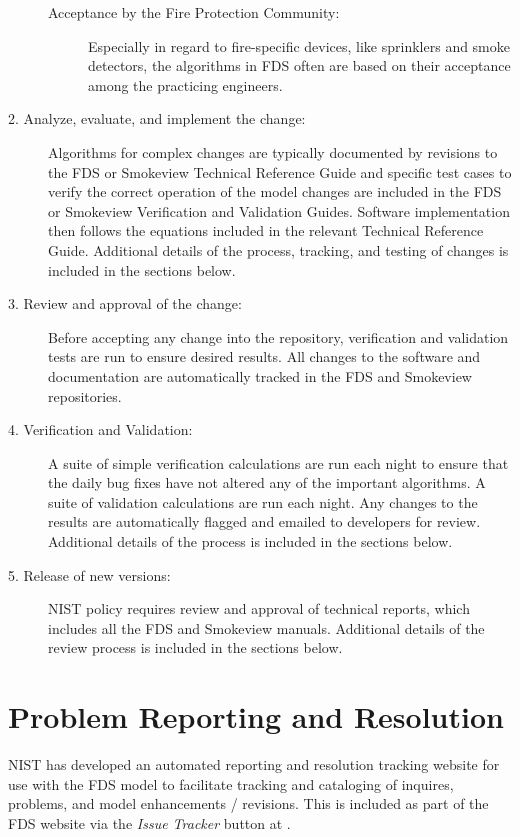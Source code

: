 \documentclass[11pt]{book}
\begin{document}
\begin{description}
\begin{description}
\item[Acceptance by the Fire Protection Community:] Especially in regard to fire-specific devices, like sprinklers and smoke detectors, the algorithms in FDS often are based on their acceptance among the practicing engineers.
\end{description}
\item [2. Analyze, evaluate, and implement the change:] Algorithms for complex changes are typically documented by revisions to the FDS or Smokeview Technical Reference Guide and specific test cases to verify the correct operation of the model changes are included in the FDS or Smokeview Verification and Validation Guides. Software implementation then follows the equations included in the relevant Technical Reference Guide. Additional details of the process, tracking, and testing of changes is included in the sections below.
\item [3. Review and approval of the change:] Before accepting any change into the repository, verification and validation tests are run to ensure desired results. All changes to the software and documentation are automatically tracked in the FDS and Smokeview repositories.
\item [4. Verification and Validation:] A suite of simple verification calculations are run each night to ensure that the daily bug fixes have not altered any of the important algorithms. A suite of validation calculations are run each night. Any changes to the results are automatically flagged and emailed to developers for review. Additional details of the process is included in the sections below.
\item [5. Release of new versions:] NIST policy requires review and approval of technical reports, which includes all the FDS and Smokeview manuals. Additional details of the review process is included in the sections below.
\end{description}

\section{Problem Reporting and Resolution}

NIST has developed an automated reporting and resolution tracking website for use with the FDS model to facilitate tracking and cataloging of inquires, problems, and model enhancements / revisions. This is included as part of the FDS website via the \emph{Issue Tracker} button at \href{https://pages.nist.gov/fds/} {}.
\end{document}
